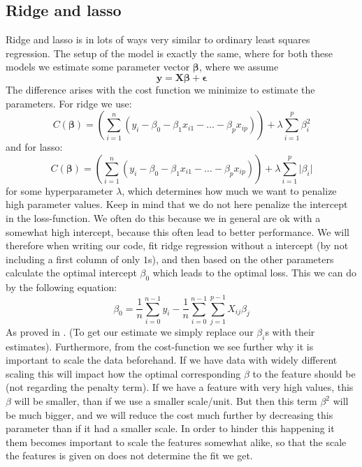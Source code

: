 \documentclass{article}
\begin{document}
\subsection{Ridge and lasso}
Ridge and lasso is in lots of ways very similar to ordinary least squares
regression. The setup of the model is exactly the same, where for both these
models we estimate some parameter vector $\mathbf{\beta}$, where we assume
$$\mathbf{y} = \mathbf{X} \mathbf{\beta} + \mathbf{\epsilon}$$
The difference arises with the cost function we minimize to estimate the parameters. For ridge we use:
$$C(\mathbf{\beta}) = \left(\sum_{i=1}^{n} (y_i - \beta_0 - \beta_1 x_{i 1} - \dots - \beta_{p} x_{i p})\right) + \lambda \sum_{i=1}^p \beta_i^2$$
and for lasso:
$$C(\mathbf{\beta}) = \left(\sum_{i=1}^{n} (y_i - \beta_0 - \beta_1 x_{i 1} - \dots - \beta_{p} x_{i p})\right) + \lambda \sum_{i=1}^p \lvert \beta_i \rvert$$
for some hyperparameter $\lambda$, which determines how much we want to penalize
high parameter values. Keep in mind that we do not here penalize the intercept
in the loss-function. We often do this because we in general are ok with a
somewhat high intercept, because this often lead to better performance. We will
therefore when writing our code, fit ridge regression without a intercept (by
not including a first column of only $1$s), and then based on the other
parameters calculate the optimal intercept $\beta_0$ which leads to the optimal
loss. This we can do by the following equation:
$$\beta_0 = \frac{1}{n} \sum_{i=0}^{n-1} y_i - \frac{1}{n} \sum_{i=0}^{n-1} \sum_{j=1}^{p-1} X_{i j} \beta_j$$
As proved in \cite[s.~Further manipulations]{week35notes}.
(To get our estimate we simply replace our $\beta_i$s with their estimates).
Furthermore, from the cost-function we see further why it is important to scale
the data beforehand. If we have data with widely different scaling this will
impact how the optimal corresponding $\beta$ to the feature should be (not
regarding the penalty term). If we have a feature with very high values, this
$\beta$ will be smaller, than if we use a smaller scale/unit. But then this term
$\beta^2$ will be much bigger, and we will reduce the cost much further by
decreasing this parameter than if it had a smaller scale. In order to hinder
this happening it them becomes important to scale the features somewhat alike,
so that the scale the features is given on does not determine the fit we get.
\end{document}
